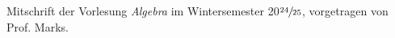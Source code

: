 \documentclass[12pt,a4paper]{article}
\theoremstyle{definition}
\theoremstyle{plain}
\begin{document}
	\setcounter{section}{-1}
	
	
	Mitschrift der Vorlesung \textit{Algebra} im Wintersemester 20$\sfrac{24}{25}$, vorgetragen von Prof. Marks. 
	
	\tableofcontents
	
	
	

	
	
	
	
	
	
	
	
	
	
	
	
	
	
	
	
\end{document}
